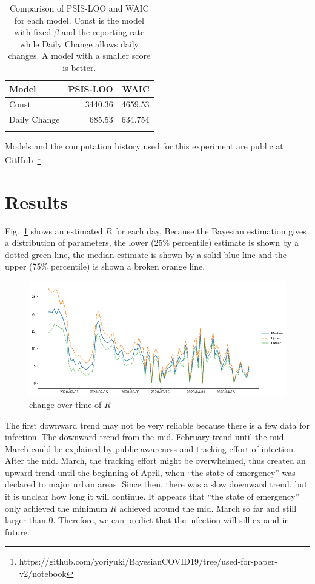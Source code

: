 \documentclass{amsart}
\begin{document}
\begin{table}[h]
\begin{center}
\begin{tabular}{lrr} \toprule
Model & PSIS-LOO & WAIC \\ \midrule 
Const & 3440.36 &  4659.53 \\ 
Daily Change & 685.53 & 634.754 \\
\bottomrule\\
\end{tabular}
\caption{Comparison of PSIS-LOO and WAIC for each model.  Const is the model with fixed $\beta$ and the reporting rate while Daily Change allows daily changes.  A model with a smaller score is better.}
\label{tbl:IC}
\end{center}
\end{table}

Models and the computation history used for this experiment are public at GitHub~\footnote{https://github.com/yoriyuki/BayesianCOVID19/tree/used-for-paper-v2/notebook}.

\section{Results}

Fig.~\ref{fig:b} shows an estimated $R$ for each day.
Because the Bayesian estimation gives a distribution of parameters, the lower (25\% percentile) estimate is shown by a dotted green line, the median estimate is shown by a solid blue line and the upper (75\% percentile) is shown a broken orange line.
\begin{figure}[h]
 \centering
 \includegraphics[width=\linewidth]{fig/R-Japan.png}
 \caption{ change over time of $R$}
 \label{fig:b}
\end{figure}
The first downward trend may not be very reliable because there is a few data for infection.
The downward trend from the mid. February trend until the mid. March could be explained by public awareness and tracking effort of infection.
After the mid. March, the tracking effort might be overwhelmed, thus created an upward trend until the beginning of April, when ``the state of emergency'' was declared to major urban areas.
Since then, there was a slow downward trend, but it is unclear how long it will continue.
It appears that ``the state of emergency'' only achieved the minimum $R$ achieved around the mid. March so far and still larger than 0.
Therefore, we can predict that the infection will sill expand in future.
\end{document}
